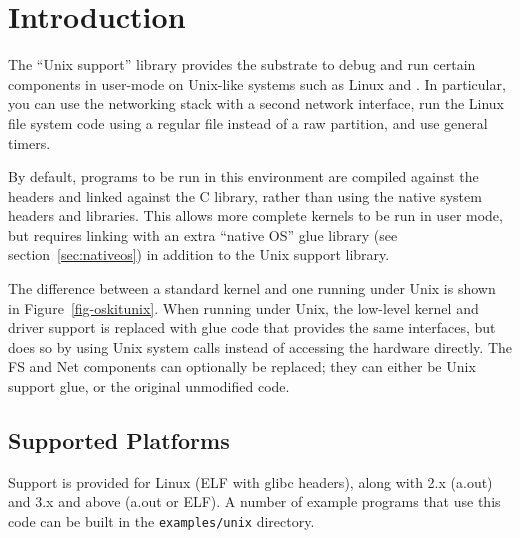 %
% 
%
\label{unix}

\section{Introduction}

The ``Unix support'' library provides the substrate to debug and run
certain \oskit{} components in user-mode on Unix-like systems such
as Linux and \freebsd{}.  In particular, you
can use the networking stack with a second network interface, run the
Linux file system code using a regular file instead of a raw
partition, and use general \oskit{} timers.

By default, programs to be run in this environment
are compiled against the \oskit{} headers and linked
against the \oskit{} C library, rather than using the native system
headers and libraries.  This allows more complete \oskit{} kernels to be
run in user mode, but requires linking with an extra ``native OS''
glue library (see section~\ref{sec:nativeos}) in addition to the
Unix support library.

The difference between a standard \oskit{} kernel and one running under
Unix is shown in Figure~\ref{fig-oskitunix}.  When running under Unix,
the low-level kernel and driver support is replaced with glue code
that provides the same interfaces, but does so by 
using Unix system calls instead of accessing the hardware directly.  
The FS and Net components can optionally be replaced; they
can either be Unix support glue, or the original unmodified code.



\subsection{Supported Platforms}

Support is provided for Linux (ELF with glibc headers), along
with \freebsd{} 2.x (a.out) and 3.x and above (a.out or ELF).
A number of example
programs that use this code can be built in the {\tt examples/unix}
directory.

